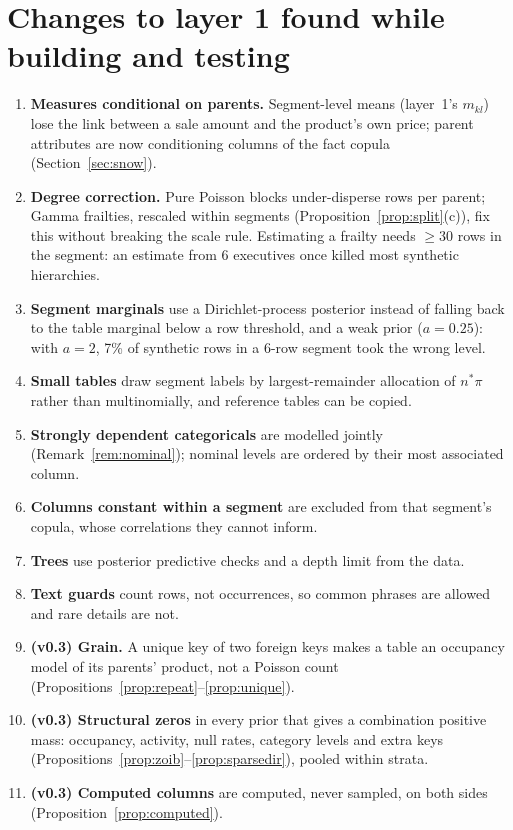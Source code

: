 \documentclass[11pt,a4paper]{article}
\theoremstyle{definition}
\theoremstyle{remark}
\begin{document}
\section{Changes to layer 1 found while building and testing}\label{sec:changes}
\begin{enumerate}
\item \textbf{Measures conditional on parents.} Segment-level means (layer~1's $m_{kl}$) lose the link between a sale amount and the product's own price; parent attributes are now conditioning columns of the fact copula (Section~\ref{sec:snow}).
\item \textbf{Degree correction.} Pure Poisson blocks under-disperse rows per parent; Gamma frailties, rescaled within segments (Proposition~\ref{prop:split}(c)), fix this without breaking the scale rule. Estimating a frailty needs $\ge30$ rows in the segment: an estimate from 6 executives once killed most synthetic hierarchies.
\item \textbf{Segment marginals} use a Dirichlet-process posterior instead of falling back to the table marginal below a row threshold, and a weak prior ($a=0.25$): with $a=2$, 7\% of synthetic rows in a 6-row segment took the wrong level.
\item \textbf{Small tables} draw segment labels by largest-remainder allocation of $n^*\pi$ rather than multinomially, and reference tables can be copied.
\item \textbf{Strongly dependent categoricals} are modelled jointly (Remark~\ref{rem:nominal}); nominal levels are ordered by their most associated column.
\item \textbf{Columns constant within a segment} are excluded from that segment's copula, whose correlations they cannot inform.
\item \textbf{Trees} use posterior predictive checks and a depth limit from the data.
\item \textbf{Text guards} count rows, not occurrences, so common phrases are allowed and rare details are not.
\item \textbf{(v0.3) Grain.} A unique key of two foreign keys makes a table an occupancy model of its parents' product, not a Poisson count (Propositions~\ref{prop:repeat}--\ref{prop:unique}).
\item \textbf{(v0.3) Structural zeros} in every prior that gives a combination positive mass: occupancy, activity, null rates, category levels and extra keys (Propositions~\ref{prop:zoib}--\ref{prop:sparsedir}), pooled within strata.
\item \textbf{(v0.3) Computed columns} are computed, never sampled, on both sides (Proposition~\ref{prop:computed}).

\end{enumerate}
\end{document}
